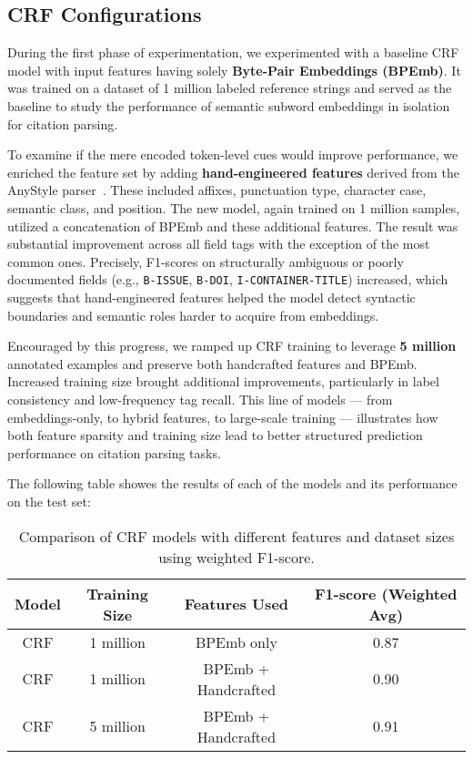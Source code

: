 \subsection{CRF Configurations}
During the first phase of experimentation, we experimented with a baseline CRF model with input features having solely \textbf{Byte-Pair Embeddings (BPEmb)}. It was trained on a dataset of 1 million labeled reference strings and served as the baseline to study the performance of semantic subword embeddings in isolation for citation parsing.

To examine if the mere encoded token-level cues would improve performance, we enriched the feature set by adding \textbf{hand-engineered features} derived from the AnyStyle parser~\cite{anystyle}. These included affixes, punctuation type, character case, semantic class, and position. The new model, again trained on 1 million samples, utilized a concatenation of BPEmb and these additional features.
The result was substantial improvement across all field tags with the exception of the most common ones. Precisely, F1-scores on structurally ambiguous or poorly documented fields (e.g., \texttt{B-ISSUE}, \texttt{B-DOI}, \texttt{I-CONTAINER-TITLE}) increased, which suggests that hand-engineered features helped the model detect syntactic boundaries and semantic roles harder to acquire from embeddings.

Encouraged by this progress, we ramped up CRF training to leverage \textbf{5 million} annotated examples and preserve both handcrafted features and BPEmb. Increased training size brought additional improvements, particularly in label consistency and low-frequency tag recall.
This line of models — from embeddings-only, to hybrid features, to large-scale training — illustrates how both feature sparsity and training size lead to better structured prediction performance on citation parsing tasks.

The following table showes the results of each of the models and its performance on the test set:
\begin{table}[h]
    \centering
    \begin{tabular}{|c|c|c|c|}
    \hline
    \textbf{Model} & \textbf{Training Size} & \textbf{Features Used} & \textbf{F1-score (Weighted Avg)} \\
    \hline
    CRF & 1 million & BPEmb only & 0.87 \\
    CRF & 1 million & BPEmb + Handcrafted & 0.90 \\
    CRF & 5 million & BPEmb + Handcrafted & 0.91 \\
    \hline
    \end{tabular}
    \caption[CRF Model Comparison (Features and Sizes)]{Comparison of CRF models with different features and dataset sizes using weighted F1-score.}
    \label{tab:crf_comparison}
\end{table}

